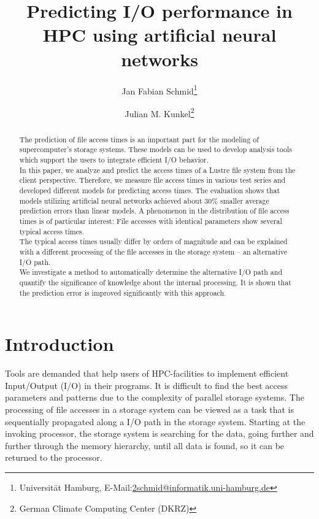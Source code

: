 \documentclass{superfri}
\begin{document}
	
	\author{Jan Fabian Schmid\footnote{\label{susu}Universität Hamburg, E-Mail:\url{2schmid@informatik.uni-hamburg.de}} \and Julian M. Kunkel\footnote{German Climate Computing Center (DKRZ)}}
	
	\title{Predicting I/O performance in HPC using artificial neural networks}
	
	\maketitle{}
	
	\begin{abstract}
		
		The prediction of file access times is an important part for the modeling of supercomputer's storage systems. 
		These models can be used to develop analysis tools which support the users to integrate efficient I/O behavior.\\
		In this paper, we analyze and predict the access times of a Lustre file system from the client perspective.
		Therefore, we measure file access times in various test series and developed different models for predicting access times. 
		The evaluation shows that models utilizing artificial neural networks achieved about 30\% smaller average prediction errors than linear models. 
		A phenomenon in the distribution of file access times is of particular interest:
		File accesses with identical parameters show several typical access times.\\
		The typical access times usually differ by orders of magnitude and can be explained with a different processing of the file accesses in the storage system -- an alternative I/O path.\\
		We investigate a method to automatically determine the alternative I/O path and quantify the significance of knowledge about the internal processing.
		It is shown that the prediction error is improved significantly with this approach.
		
	\end{abstract}
	
	\section*{Introduction}
	\label{sec:intro}
	
	Tools are demanded that help users of HPC-facilities to implement efficient Input/Output (I/O) in their programs.
	It is difficult to find the best access parameters and patterns due to the complexity of parallel storage systems.
	The processing of file accesses in a storage system can be viewed as a task that is sequentially propagated along a I/O path in the storage system.
	Starting at the invoking processor, the storage system is searching for the data, going further and further through the memory hierarchy, until all data is found, so it can be returned to the processor.
	
\end{document}
